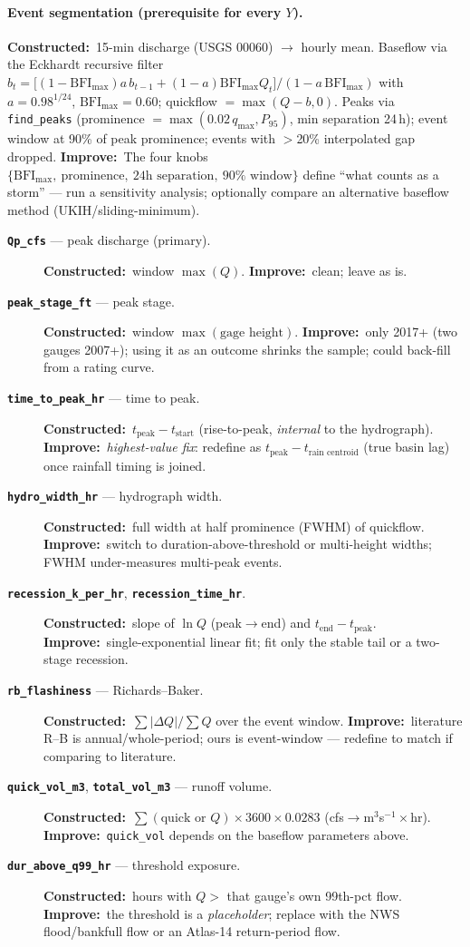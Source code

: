 \documentclass[11pt]{article}
\newcommand{\imp}{\textcolor{impcol}{\textbf{Improve:}}\ }
\newcommand{\con}{\textbf{Constructed:}\ }
\newcommand{\var}[1]{\textbf{\texttt{#1}}}
\begin{document}
\paragraph{Event segmentation (prerequisite for every $Y$).}
\con 15-min discharge (USGS 00060) $\to$ hourly mean. Baseflow via the Eckhardt recursive filter
$b_t=\big[(1-\text{BFI}_{\max})a\,b_{t-1}+(1-a)\text{BFI}_{\max}Q_t\big]/(1-a\,\text{BFI}_{\max})$
with $a=0.98^{1/24}$, $\text{BFI}_{\max}=0.60$; quickflow $=\max(Q-b,0)$. Peaks via
\texttt{find\_peaks} (prominence $=\max(0.02\,q_{\max},P_{95})$, min separation 24\,h);
event window at 90\% of peak prominence; events with $>$20\% interpolated gap dropped.
\imp The four knobs $\{\text{BFI}_{\max},\ \text{prominence},\ 24\text{h separation},\ 90\%\text{ window}\}$
define ``what counts as a storm'' --- run a sensitivity analysis; optionally compare an alternative
baseflow method (UKIH/sliding-minimum).

\begin{description}
\item[\var{Qp\_cfs} --- peak discharge (primary).] \con window $\max(Q)$. \imp clean; leave as is.
\item[\var{peak\_stage\_ft} --- peak stage.] \con window $\max(\text{gage height})$. \imp only 2017+
(two gauges 2007+); using it as an outcome shrinks the sample; could back-fill from a rating curve.
\item[\var{time\_to\_peak\_hr} --- time to peak.] \con $t_{\text{peak}}-t_{\text{start}}$ (rise-to-peak,
\emph{internal} to the hydrograph). \imp \emph{highest-value fix}: redefine as
$t_{\text{peak}}-t_{\text{rain centroid}}$ (true basin lag) once rainfall timing is joined.
\item[\var{hydro\_width\_hr} --- hydrograph width.] \con full width at half prominence (FWHM) of quickflow.
\imp switch to duration-above-threshold or multi-height widths; FWHM under-measures multi-peak events.
\item[\var{recession\_k\_per\_hr}, \var{recession\_time\_hr}.] \con slope of $\ln Q$ (peak$\to$end) and
$t_{\text{end}}-t_{\text{peak}}$. \imp single-exponential linear fit; fit only the stable tail or a two-stage recession.
\item[\var{rb\_flashiness} --- Richards--Baker.] \con $\sum|\Delta Q|/\sum Q$ over the event window.
\imp literature R--B is annual/whole-period; ours is event-window --- redefine to match if comparing to literature.
\item[\var{quick\_vol\_m3}, \var{total\_vol\_m3} --- runoff volume.] \con $\sum(\text{quick or }Q)\times3600\times0.0283$
(cfs$\to$m$^3$s$^{-1}\times$hr). \imp \texttt{quick\_vol} depends on the baseflow parameters above.
\item[\var{dur\_above\_q99\_hr} --- threshold exposure.] \con hours with $Q>$ that gauge's own 99th-pct flow.
\imp the threshold is a \emph{placeholder}; replace with the NWS flood/bankfull flow or an Atlas-14 return-period flow.
\end{description}
\end{document}

